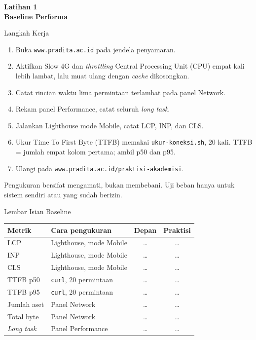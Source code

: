 \documentclass[aspectratio=169, table, 12pt]{beamer}
\begin{document}
\begin{frame}{\hfill}
  \centering
  \Huge{\textbf{Latihan 1\\Baseline Performa}}
\end{frame}

\begin{frame}{{\Large Langkah Kerja}}
  \vspace{5pt}
  \begin{enumerate}
    \item Buka \texttt{www.pradita.ac.id} pada jendela penyamaran.
    \item Aktifkan Slow 4G dan \textit{throttling} Central Processing Unit (CPU) empat kali lebih lambat, lalu
          muat ulang dengan \textit{cache} dikosongkan.
    \item Catat rincian waktu lima permintaan terlambat pada panel Network.
    \item Rekam panel Performance, catat seluruh \textit{long task}.
    \item Jalankan Lighthouse mode Mobile, catat LCP, INP, dan CLS.
    \item Ukur Time To First Byte (TTFB) memakai \texttt{ukur-koneksi.sh}, 20 kali. TTFB = jumlah empat kolom pertama; ambil p50 dan p95.
    \item Ulangi pada \texttt{www.pradita.ac.id/praktisi-akademisi}.
  \end{enumerate}
  \vspace{4pt}
  {\footnotesize Pengukuran bersifat mengamati, bukan membebani. Uji beban
  hanya untuk sistem sendiri atau yang sudah berizin.}
\end{frame}

\begin{frame}{{\Large Lembar Isian Baseline}}
  \vspace{5pt}
  \centering
  {\small
  \begin{tabularx}{0.97\textwidth}{lXcc}
    \hline
    \textbf{Metrik} & \textbf{Cara pengukuran} & \textbf{Depan} & \textbf{Praktisi} \\
    \hline
    LCP & Lighthouse, mode Mobile & \dots & \dots \\
    \hline
    INP & Lighthouse, mode Mobile & \dots & \dots \\
    \hline
    CLS & Lighthouse, mode Mobile & \dots & \dots \\
    \hline
    TTFB p50 & \texttt{curl}, 20 permintaan & \dots & \dots \\
    \hline
    TTFB p95 & \texttt{curl}, 20 permintaan & \dots & \dots \\
    \hline
    Jumlah aset & Panel Network & \dots & \dots \\
    \hline
    Total byte & Panel Network & \dots & \dots \\
    \hline
    \textit{Long task} & Panel Performance & \dots & \dots \\
    \hline
  \end{tabularx}}
\end{frame}
\end{document}

